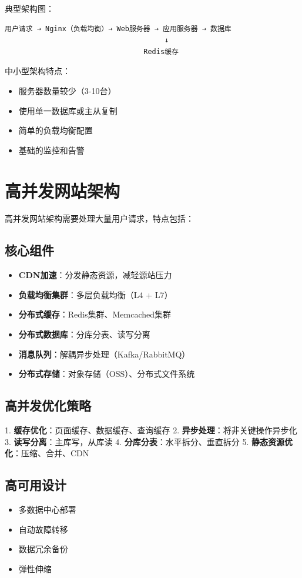 \documentclass[12pt,UTF8]{ctexbook}
\begin{document}
典型架构图：
\begin{lstlisting}
用户请求 → Nginx（负载均衡）→ Web服务器 → 应用服务器 → 数据库
                                      ↓
                                 Redis缓存
\end{lstlisting}

中小型架构特点：
\begin{itemize}
    \item 服务器数量较少（3-10台）
    \item 使用单一数据库或主从复制
    \item 简单的负载均衡配置
    \item 基础的监控和告警
\end{itemize}

\section{高并发网站架构}
\label{sec:high-concurrency-arch}

高并发网站架构需要处理大量用户请求，特点包括：

\subsection*{核心组件}
\begin{itemize}
    \item \textbf{CDN加速}：分发静态资源，减轻源站压力
    \item \textbf{负载均衡集群}：多层负载均衡（L4 + L7）
    \item \textbf{分布式缓存}：Redis集群、Memcached集群
    \item \textbf{分布式数据库}：分库分表、读写分离
    \item \textbf{消息队列}：解耦异步处理（Kafka/RabbitMQ）
    \item \textbf{分布式存储}：对象存储（OSS）、分布式文件系统
\end{itemize}

\subsection*{高并发优化策略}
1. \textbf{缓存优化}：页面缓存、数据缓存、查询缓存
2. \textbf{异步处理}：将非关键操作异步化
3. \textbf{读写分离}：主库写，从库读
4. \textbf{分库分表}：水平拆分、垂直拆分
5. \textbf{静态资源优化}：压缩、合并、CDN

\subsection*{高可用设计}
\begin{itemize}
    \item 多数据中心部署
    \item 自动故障转移
    \item 数据冗余备份
    \item 弹性伸缩
\end{itemize}
\end{document}
